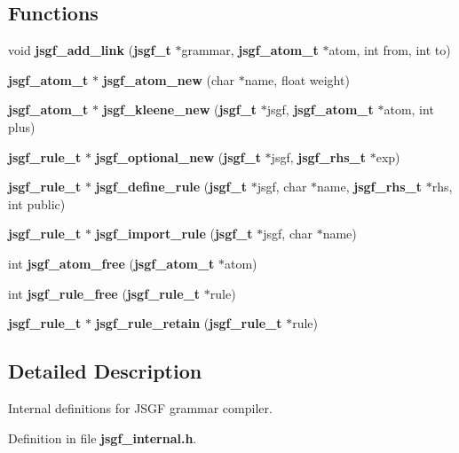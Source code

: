 \subsection*{\-Functions}
\begin{DoxyCompactItemize}
\item 
void {\bfseries jsgf\-\_\-add\-\_\-link} ({\bf jsgf\-\_\-t} $\ast$grammar, {\bf jsgf\-\_\-atom\-\_\-t} $\ast$atom, int from, int to)\label{jsgf__internal_8h_acb5af4a04abc56a8584eba9b937f8154}

\item 
{\bf jsgf\-\_\-atom\-\_\-t} $\ast$ {\bfseries jsgf\-\_\-atom\-\_\-new} (char $\ast$name, float weight)\label{jsgf__internal_8h_a0e59b63784fa8761358bb2bdf568bec1}

\item 
{\bf jsgf\-\_\-atom\-\_\-t} $\ast$ {\bfseries jsgf\-\_\-kleene\-\_\-new} ({\bf jsgf\-\_\-t} $\ast$jsgf, {\bf jsgf\-\_\-atom\-\_\-t} $\ast$atom, int plus)\label{jsgf__internal_8h_ab9dc2ab39224cda76c43822150cf7e67}

\item 
{\bf jsgf\-\_\-rule\-\_\-t} $\ast$ {\bfseries jsgf\-\_\-optional\-\_\-new} ({\bf jsgf\-\_\-t} $\ast$jsgf, {\bf jsgf\-\_\-rhs\-\_\-t} $\ast$exp)\label{jsgf__internal_8h_a4a07cb0721add8783f0ea24dfacd6c0f}

\item 
{\bf jsgf\-\_\-rule\-\_\-t} $\ast$ {\bfseries jsgf\-\_\-define\-\_\-rule} ({\bf jsgf\-\_\-t} $\ast$jsgf, char $\ast$name, {\bf jsgf\-\_\-rhs\-\_\-t} $\ast$rhs, int public)\label{jsgf__internal_8h_a91539f6bf30f85af4b90b5a85598f53f}

\item 
{\bf jsgf\-\_\-rule\-\_\-t} $\ast$ {\bfseries jsgf\-\_\-import\-\_\-rule} ({\bf jsgf\-\_\-t} $\ast$jsgf, char $\ast$name)\label{jsgf__internal_8h_afe1e47584e4dd80929552ffed77373f2}

\item 
int {\bfseries jsgf\-\_\-atom\-\_\-free} ({\bf jsgf\-\_\-atom\-\_\-t} $\ast$atom)\label{jsgf__internal_8h_a289d683bf62d1a5aaac6917fa64f54f2}

\item 
int {\bfseries jsgf\-\_\-rule\-\_\-free} ({\bf jsgf\-\_\-rule\-\_\-t} $\ast$rule)\label{jsgf__internal_8h_af2faf6fb74ad1e4d43cf990c1bcec672}

\item 
{\bf jsgf\-\_\-rule\-\_\-t} $\ast$ {\bfseries jsgf\-\_\-rule\-\_\-retain} ({\bf jsgf\-\_\-rule\-\_\-t} $\ast$rule)\label{jsgf__internal_8h_ad152a23eb0f0d9af8417919fc93074fd}

\end{DoxyCompactItemize}


\subsection{\-Detailed \-Description}
\-Internal definitions for \-J\-S\-G\-F grammar compiler. 

\-Definition in file {\bf jsgf\-\_\-internal.\-h}.


